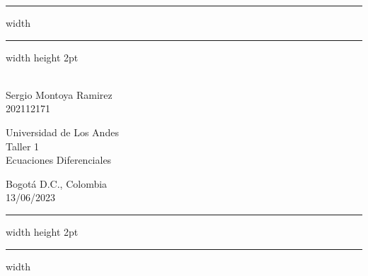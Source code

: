 \newenvironment{notes}
  {\begin{list}
     {{\fbseries Note \arabic{counter}.}}
    {\usecounter{counter}
     \setlength{\labelsep}{1em}
     \setlength{\itemsep}{2pt}
     \setlength{\leftmargin}{2em}
     \setlength{\rightmargin}{0cm}
     \setlength{\itemindent}{1em} }}
{\end{list}}

\vspace*{-1cm}
\hrule width \hsize \kern 1mm \hrule width \hsize height 2pt
\begin{center}
   \parbox[c]{.32\textwidth}{
   \hspace{1cm}\\
   Sergio Montoya Ramirez\\
   202112171}
   \hspace*{\fill}
   \parbox[c]{.35\textwidth}{\centering
   Universidad de Los Andes\\
   Taller 1\\
   Ecuaciones Diferenciales\\
   }
   \hspace*{\fill}
   \parbox[c]{.3\textwidth}{
   \begin{flushleft}
      Bogotá D.C., Colombia\\
      13/06/2023
   \end{flushleft}}
\end{center}
\hrule width \hsize height 2pt \kern 1mm \hrule width \hsize

\bigskip

